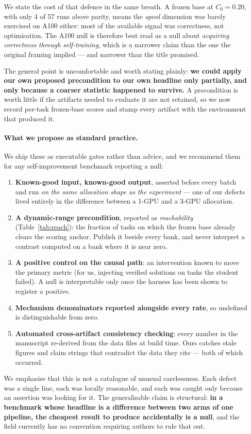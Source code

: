 We state the cost of that defence in the same breath. A frozen base at $C_0 = 0.20$, with only
4 of 57 runs above parity, means the \emph{speed} dimension was barely exercised on A100 either:
most of the available signal was correctness, not optimisation. The A100 null is therefore best
read as a null about \emph{acquiring correctness through self-training}, which is a narrower
claim than the one the original framing implied --- and narrower than the title promised.

The general point is uncomfortable and worth stating plainly: \textbf{we could apply our own
proposed precondition to our own headline only partially, and only because a coarser statistic
happened to survive.} A precondition is worth little if the artifacts needed to evaluate it are
not retained, so we now record per-task frozen-base scores and stamp every artifact with the
environment that produced it.

\paragraph{What we propose as standard practice.}
We ship these as executable gates rather than advice, and we recommend them for any
self-improvement benchmark reporting a null:
\begin{enumerate}[leftmargin=1.6em,itemsep=1pt]
\item \textbf{Known-good input, known-good output}, asserted before every batch and run
\emph{on the same allocation shape as the experiment} --- one of our defects lived entirely in
the difference between a 1-GPU and a 3-GPU allocation.
\item \textbf{A dynamic-range precondition}, reported as \emph{reachability}
(Table~\ref{tab:reach}): the fraction of tasks on which the frozen base already clears the
scoring anchor. Publish it beside every bank, and never interpret a contrast computed on a
bank where it is near zero.
\item \textbf{A positive control on the causal path}: an intervention known to move the primary
metric (for us, injecting verified solutions on tasks the student failed). A null is
interpretable only once the harness has been shown to register a positive.
\item \textbf{Mechanism denominators reported alongside every rate}, so undefined is
distinguishable from zero.
\item \textbf{Automated cross-artifact consistency checking}: every number in the manuscript
re-derived from the data files at build time. Ours catches stale figures and claim strings that
contradict the data they cite --- both of which occurred.
\end{enumerate}

We emphasise that this is not a catalogue of unusual carelessness. Each defect was a single
line, each was locally reasonable, and each was caught only because an assertion was looking
for it. The generalisable claim is structural: \textbf{in a benchmark whose headline is a
difference between two arms of one pipeline, the cheapest result to produce accidentally is a
null}, and the field currently has no convention requiring authors to rule that out.
